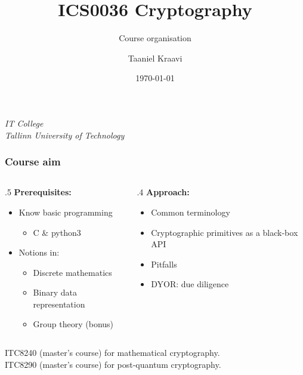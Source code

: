 \title{ICS0036 Cryptography}
\subtitle{Course organisation}
\date{\today}
\author{Taaniel Kraavi}
\institute%
{%
  \textit{IT College}\\
  \textit{Tallinn University of Technology}
}


\begin{frame}
  \titlepage
\end{frame}

\begin{frame}
  \frametitle{Course aim}

  \begin{columns}[T]
    \begin{column}{.5\textwidth}
      \textbf{Prerequisites:}
      \begin{itemize}[<+(1)->]
        \item Know basic programming
        \begin{itemize}
          \item C \& python3
        \end{itemize}
        \item Notions in:
        \begin{itemize}
          \item Discrete mathematics
          \item Binary data representation
          \item Group theory (bonus)
        \end{itemize}
      \end{itemize}
    \end{column}

    \pause
    \begin{column}{.4\textwidth}
      \textbf{Approach:}
      \begin{itemize}[<+(1)->]
        \item Common terminology
        \item Cryptographic primitives as a black-box API
        \item Pitfalls
        \item DYOR: due diligence
      \end{itemize}
    \end{column}
  \end{columns}

  \vspace*{2em}

  \pause
  ITC8240 (master's course) for mathematical cryptography.\\
  \pause
  ITC8290 (master's course) for post-quantum cryptography.
\end{frame}

